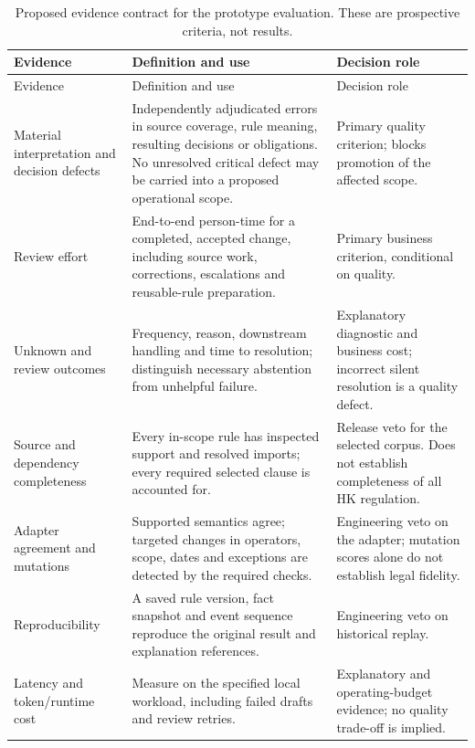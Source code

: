 
\begingroup\small
\begin{longtable}{P{0.25\textwidth}P{0.39\textwidth}P{0.26\textwidth}}
\caption{Proposed evidence contract for the prototype evaluation. These are
prospective criteria, not results.}\label{tab:evaluation}\\
\toprule Evidence & Definition and use & Decision role \\\midrule
\endfirsthead
\toprule Evidence & Definition and use & Decision role \\\midrule
\endhead
Material interpretation and decision defects & Independently adjudicated errors
in source coverage, rule meaning, resulting decisions or obligations. No unresolved
critical defect may be carried into a proposed operational scope. & Primary quality
criterion; blocks promotion of the affected scope.\\
Review effort & End-to-end person-time for a completed, accepted change, including
source work, corrections, escalations and reusable-rule preparation. & Primary
business criterion, conditional on quality.\\
Unknown and review outcomes & Frequency, reason, downstream handling and time to
resolution; distinguish necessary abstention from unhelpful failure. & Explanatory
diagnostic and business cost; incorrect silent resolution is a quality defect.\\
Source and dependency completeness & Every in-scope rule has inspected support and
resolved imports; every required selected clause is accounted for. & Release veto
for the selected corpus. Does not establish completeness of all HK regulation.\\
Adapter agreement and mutations & Supported semantics agree; targeted changes in
operators, scope, dates and exceptions are detected by the required checks. &
Engineering veto on the adapter; mutation scores alone do not establish legal fidelity.\\
Reproducibility & A saved rule version, fact snapshot and event sequence reproduce
the original result and explanation references. & Engineering veto on historical replay.\\
Latency and token/runtime cost & Measure on the specified local workload, including
failed drafts and review retries. & Explanatory and operating-budget evidence; no
quality trade-off is implied.\\
\bottomrule
\end{longtable}
\endgroup

